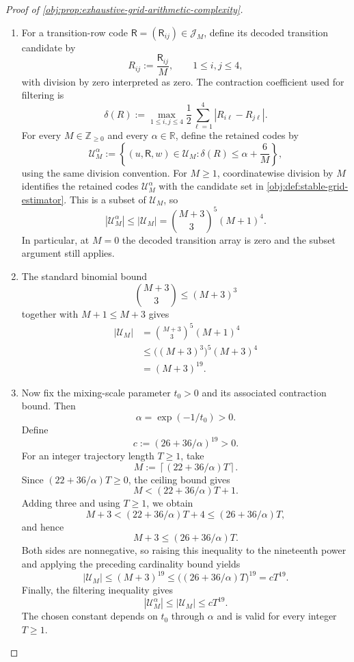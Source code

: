 \documentclass[11pt]{article}
\begin{document}
\begin{proof}[Proof of \cref{obj:prop:exhaustive-grid-arithmetic-complexity}]
\begin{enumerate}
\item For a transition-row code
\(\mathsf R=(\mathsf R_{ij})\in\mathcal J_M\), define its decoded transition candidate by
\[
R_{ij}:=\frac{\mathsf R_{ij}}{M},
\qquad 1\le i,j\le4,
\]
with division by zero interpreted as zero. The contraction coefficient used for filtering is
\[
\delta(R)
:=
\max_{1\le i,j\le4}
\frac12\sum_{\ell=1}^{4}|R_{i\ell}-R_{j\ell}|.
\]
For every \(M\in\mathbb Z_{\ge0}\) and every \(\alpha\in\mathbb R\), define the retained codes by
\[
\mathcal U_M^\alpha
:=
\left\{
(u,\mathsf R,w)\in\mathcal U_M:
\delta(R)\le\alpha+\frac6M
\right\},
\]
using the same division convention. For \(M\ge1\), coordinatewise division by \(M\) identifies the retained codes \(\mathcal U_M^\alpha\) with the candidate set in \cref{obj:def:stable-grid-estimator}. This is a subset of \(\mathcal U_M\), so
\[
|\mathcal U_M^\alpha|
\le
|\mathcal U_M|
=
\binom{M+3}{3}^{5}(M+1)^4.
\]
In particular, at \(M=0\) the decoded transition array is zero and the subset argument still applies.

\item The standard binomial bound
\[
\binom{M+3}{3}\le(M+3)^3
\]
together with \(M+1\le M+3\) gives
\[
\begin{aligned}
|\mathcal U_M|
&=\binom{M+3}{3}^{5}(M+1)^4\\
&\le \bigl((M+3)^3\bigr)^5(M+3)^4\\
&=(M+3)^{19}.
\end{aligned}
\]

\item Now fix the mixing-scale parameter \(t_0>0\) and its associated contraction bound. Then
\[
\alpha=\exp(-1/t_0)>0.
\]
Define
\[
c:=(26+36/\alpha)^{19}>0.
\]
For an integer trajectory length \(T\ge1\), take
\[
M:=\left\lceil(22+36/\alpha)T\right\rceil.
\]
Since \((22+36/\alpha)T\ge0\), the ceiling bound gives
\[
M<(22+36/\alpha)T+1.
\]
Adding three and using \(T\ge1\), we obtain
\[
M+3
<
(22+36/\alpha)T+4
\le
(26+36/\alpha)T,
\]
and hence
\[
M+3\le(26+36/\alpha)T.
\]
Both sides are nonnegative, so raising this inequality to the nineteenth power and applying the preceding cardinality bound yields
\[
|\mathcal U_M|
\le
(M+3)^{19}
\le
\bigl((26+36/\alpha)T\bigr)^{19}
=
cT^{19}.
\]
Finally, the filtering inequality gives
\[
|\mathcal U_M^\alpha|
\le
|\mathcal U_M|
\le
cT^{19}.
\]
The chosen constant depends on \(t_0\) through \(\alpha\) and is valid for every integer \(T\ge1\).
\end{enumerate}
\end{proof}




\end{document}
